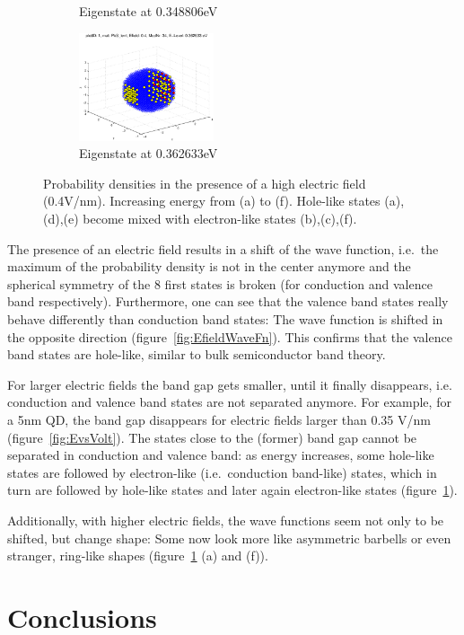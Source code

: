 \begin{figure}[htbp]
\begin{subfigure}{150px}
		\caption{Eigenstate at 0.348806eV}
	\end{subfigure}
	\begin{subfigure}{150px}
		\includegraphics[width=150px]{Fig/Plots/r25v04Mod34}
		\caption{Eigenstate at 0.362633eV}
	\end{subfigure}
	\caption{Probability densities in the presence of a high electric field (0.4V/nm). Increasing energy from (a) to (f). Hole-like states (a),(d),(e) become mixed with electron-like states (b),(c),(f).}
	\label{fig:HighEfieldWaveFn}
\end{figure}


The presence of an electric field results in a shift of the wave function, i.e.~the maximum of the probability density is not in the center anymore and the spherical symmetry of the 8 first states is broken (for conduction and valence band respectively). Furthermore, one can see that the valence band states really behave differently than conduction band states: The wave function is shifted in the opposite direction (figure~\ref{fig:EfieldWaveFn}). This confirms that the valence band states are hole-like, similar to bulk semiconductor band theory. 
	
For larger electric fields the band gap gets smaller, until it finally disappears, i.e. conduction and valence band states are not separated anymore. For example, for a 5nm  QD, the band gap disappears for electric fields larger than 0.35 V/nm (figure~\ref{fig:EvsVolt}). The states close to the (former) band gap cannot be separated in conduction and valence band: as energy increases, some hole-like states are followed by electron-like (i.e.~conduction band-like) states, which in turn are followed by hole-like states and later again electron-like states (figure~\ref{fig:HighEfieldWaveFn}).
	
Additionally, with higher electric fields, the wave functions seem not only to be shifted, but change shape: Some now look more like asymmetric barbells or even stranger, ring-like shapes (figure~\ref{fig:HighEfieldWaveFn} (a) and (f)).

\FloatBarrier

\section{Conclusions}

